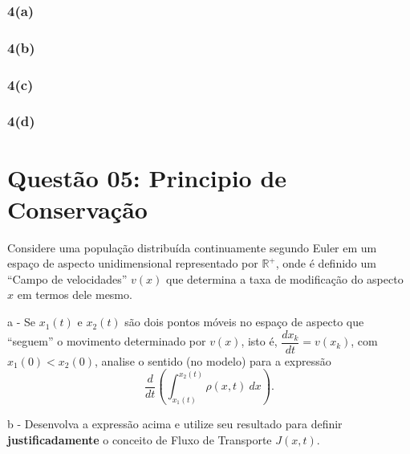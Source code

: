 
\subsection*{4(a)}

\subsection*{4(b)}

\subsection*{4(c)}

\subsection*{4(d)}









\clearpage
\chapter*{Questão 05: Principio de Conservação}


Considere uma população distribuída continuamente segundo Euler em um espaço de aspecto unidimensional representado por \(\mathbb{R}^+\), onde é definido um ``Campo de velocidades'' $v(x)$ que determina a taxa de modificação do aspecto $x$ em termos dele mesmo.

\begin{description}
\item a - Se $x_1(t)$ e $x_2(t)$ são dois pontos móveis no espaço de aspecto que ``seguem'' o movimento determinado por $v(x)$, isto é, $\dfrac{dx_k}{dt} = v(x_k)$, com $x_1(0) < x_2(0)$, analise o sentido (no modelo) para a expressão
\[\dfrac{d}{dt}\left(\displaystyle\int_{x_1(t)}^{x_2(t)} \rho(x,t)\ dx \right).\]

\item b - Desenvolva a expressão acima e utilize seu resultado para definir \textbf{justificadamente} o conceito de Fluxo de Transporte $J(x,t)$.
\end{description}

